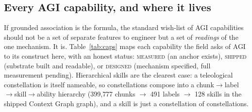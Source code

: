 \documentclass[10pt,twocolumn]{article}
\begin{document}
\subsection{Every AGI capability, and where it lives}
\label{sec:capabilities}
If grounded association is the formula, the standard wish-list of AGI capabilities
should not be a set of separate features to engineer but a set of \emph{readings}
of the one mechanism. It is. Table~\ref{tab:caps} maps each capability the field
asks of AGI to its construct here, with an honest status: \textsc{measured} (an
anchor exists), \textsc{shipped} (substrate built and readable), or
\textsc{designed} (mechanism specified, full measurement pending). Hierarchical
skills are the clearest case: a teleological constellation is itself nameable, so
constellations compose into a chunk$\to$label$\to$skill$\to$ability hierarchy
(399{,}777 chunks $\to$ 491 labels $\to$ 128 skills in the shipped Context Graph
graph), and a skill is just a constellation of constellations.
\end{document}
